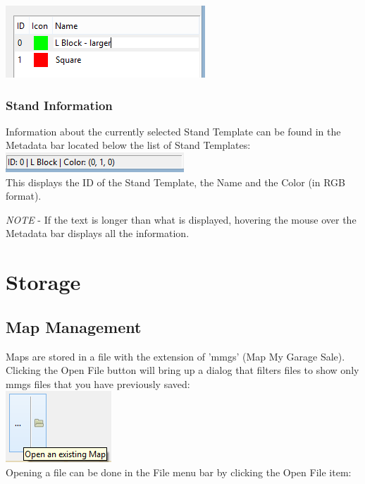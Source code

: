\documentclass{report}
\begin{document}
\includegraphics{renamestandtemplate.png}

\subsection{Stand Information}

Information about the currently selected Stand Template can be found in the Metadata bar
located below the list of Stand Templates:\\

\includegraphics{metadatabar.png}\\

This displays the ID of the Stand Template, the Name and the Color (in RGB format).  

\emph{NOTE} - If the text is longer than what is displayed, hovering the 
mouse over the Metadata bar displays all the information.

\newpage
\chapter{Storage}

\section{Map Management}
Maps are stored in a file with the extension of 'mmgs' (Map My Garage Sale).  Clicking the 
Open File button will bring up a dialog that filters files to show only mmgs files that you have
previously saved:\\

\includegraphics{openfiledialog.png}\\

Opening a file can be done in the File menu bar by clicking the Open File item:\\
\end{document}
